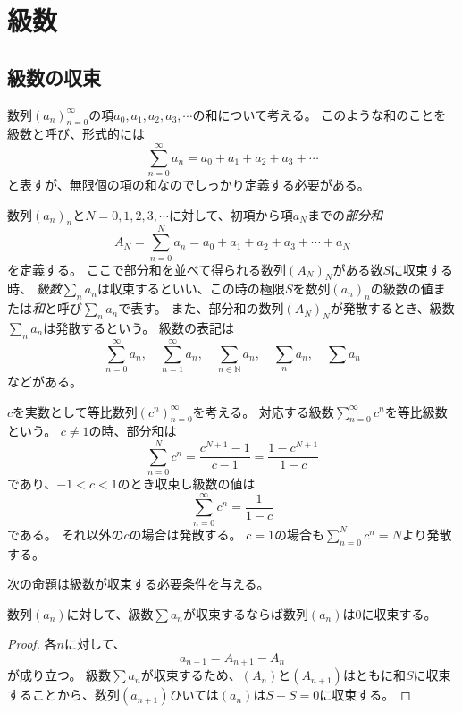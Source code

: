 
\chapter{級数}

\section{級数の収束}

数列$(a_n)_{n = 0}^\infty$の項$a_0, a_1, a_2, a_3, \cdots$の和について考える。
このような和のことを級数と呼び、形式的には
$$
\sum_{n = 0}^\infty a_n = a_0+a_1+a_2+a_3+\cdots
$$
と表すが、無限個の項の和なのでしっかり定義する必要がある。

\begin{definition}[級数]
数列$(a_n)_n$と$N = 0, 1, 2, 3, \cdots$に対して、初項から項$a_N$までの\emph{部分和}
$$
A_N = \sum_{n = 0}^N a_n = a_0+a_1+a_2+a_3+\cdots+a_N
$$
を定義する。
ここで部分和を並べて得られる数列$(A_N)_N$がある数$S$に収束する時、
\emph{級数}$\sum_n a_n$は収束するといい、この時の極限$S$を数列$(a_n)_n$の級数の値または\emph{和}と呼び$\sum_n a_n$で表す。
また、部分和の数列$(A_N)_N$が発散するとき、級数$\sum_n a_n$は発散するという。
級数の表記は
$$
\sum_{n = 0}^\infty a_n, \quad \sum_{n = 1}^\infty a_n, \quad \sum_{n \in \mathbb{N}}a_n, \quad \sum_n a_n, \quad \sum a_n
$$
などがある。
\end{definition}

\begin{example}
$c$を実数として等比数列$(c^n)_{n = 0}^\infty$を考える。
対応する級数$\sum_{n = 0}^\infty c^n$を等比級数という。
$c \ne 1$の時、部分和は
$$
\sum_{n = 0}^N c^n = \frac{c^{N+1}-1}{c-1} = \frac{1-c^{N+1}}{1-c}
$$
であり、$-1 < c < 1$のとき収束し級数の値は
$$
\sum_{n = 0}^\infty c^n = \frac{1}{1-c}
$$
である。
それ以外の$c$の場合は発散する。
$c = 1$の場合も$\sum_{n = 0}^N c^n = N$より発散する。
\end{example}

次の命題は級数が収束する必要条件を与える。

\begin{proposition}
数列$(a_n)$に対して、級数$\sum a_n$が収束するならば数列$(a_n)$は$0$に収束する。
\end{proposition}

\begin{proof}
各$n$に対して、
$$
a_{n+1} = A_{n+1}-A_n
$$
が成り立つ。
級数$\sum a_n$が収束するため、$(A_n)$と$(A_{n+1})$はともに和$S$に収束することから、数列$(a_{n+1})$ひいては$(a_n)$は$S-S = 0$に収束する。
\end{proof}

